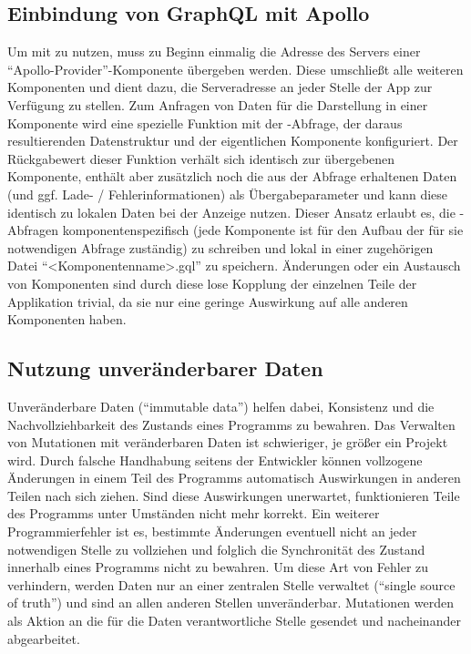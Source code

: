 \subsection{Einbindung von GraphQL mit Apollo}
Um  mit  zu nutzen, muss zu Beginn einmalig die Adresse des Servers einer \enquote{Apollo-Provider}-Komponente übergeben werden. Diese umschließt alle weiteren Komponenten und dient dazu, die Serveradresse an jeder Stelle der App zur Verfügung zu stellen. Zum Anfragen von Daten für die Darstellung in einer Komponente wird eine spezielle Funktion mit der -Abfrage, der daraus resultierenden Datenstruktur und der eigentlichen Komponente konfiguriert. Der Rückgabewert dieser Funktion verhält sich identisch zur übergebenen Komponente, enthält aber zusätzlich noch die aus der Abfrage erhaltenen Daten (und ggf. Lade- / Fehlerinformationen) als Übergabeparameter und kann diese identisch zu lokalen Daten bei der Anzeige nutzen.
Dieser Ansatz erlaubt es, die -Abfragen komponentenspezifisch (jede Komponente ist für den Aufbau der für sie notwendigen Abfrage zuständig) zu schreiben und lokal in einer zugehörigen Datei \enquote{<Komponentenname>.gql} zu speichern. Änderungen oder ein Austausch von Komponenten sind durch diese lose Kopplung der einzelnen Teile der Applikation trivial, da sie nur eine geringe Auswirkung auf alle anderen Komponenten haben.

\subsection{Nutzung unveränderbarer Daten}
Unveränderbare Daten (\enquote{immutable data}) helfen dabei, Konsistenz und die Nachvollziehbarkeit des Zustands eines Programms zu bewahren. Das Verwalten von Mutationen mit veränderbaren Daten ist schwieriger, je größer ein Projekt wird. Durch falsche Handhabung seitens der Entwickler können vollzogene Änderungen in einem Teil des Programms automatisch Auswirkungen in anderen Teilen nach sich ziehen. Sind diese Auswirkungen unerwartet, funktionieren Teile des Programms unter Umständen nicht mehr korrekt. Ein weiterer Programmierfehler ist es, bestimmte Änderungen eventuell nicht an jeder notwendigen Stelle zu vollziehen und folglich die Synchronität des Zustand innerhalb eines Programms nicht zu bewahren. Um diese Art von Fehler zu verhindern, werden Daten nur an einer zentralen Stelle verwaltet (\enquote{single source of truth}) und sind an allen anderen Stellen unveränderbar. Mutationen werden als Aktion an die für die Daten verantwortliche Stelle gesendet und nacheinander abgearbeitet.

